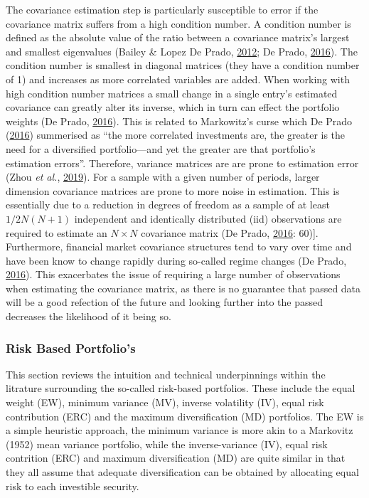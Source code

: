 \documentclass[11pt,preprint, authoryear]{elsarticle}
\numberwithin{equation}{section}
\numberwithin{figure}{section}
\numberwithin{table}{section}
\begin{document}
The covariance estimation step is particularly susceptible to error if
the covariance matrix suffers from a high condition number. A condition
number is defined as the absolute value of the ratio between a
covariance matrix's largest and smallest eigenvalues (Bailey \& Lopez De
Prado, \protect\hyperlink{ref-lopez2012}{2012}; De Prado,
\protect\hyperlink{ref-lopez}{2016}). The condition number is smallest
in diagonal matrices (they have a condition number of 1) and increases
as more correlated variables are added. When working with high condition
number matrices a small change in a single entry's estimated covariance
can greatly alter its inverse, which in turn can effect the portfolio
weights (De Prado, \protect\hyperlink{ref-lopez}{2016}). This is related
to Markowitz's curse which De Prado
(\protect\hyperlink{ref-lopez}{2016}) summerised as ``the more
correlated investments are, the greater is the need for a diversified
portfolio---and yet the greater are that portfolio's estimation
errors''. Therefore, variance matrices are are prone to estimation error
(Zhou \emph{et al.}, \protect\hyperlink{ref-zhou2019}{2019}). For a
sample with a given number of periods, larger dimension covariance
matrices are prone to more noise in estimation. This is essentially due
to a reduction in degrees of freedom as a sample of at least
\(1/2N(N+1)\) independent and identically distributed (iid) observations
are required to estimate an \(N\times N\) covariance matrix (De Prado,
\protect\hyperlink{ref-lopez}{2016}: 60){]}. Furthermore, financial
market covariance structures tend to vary over time and have been know
to change rapidly during so-called regime changes (De Prado,
\protect\hyperlink{ref-lopez}{2016}). This exacerbates the issue of
requiring a large number of observations when estimating the covariance
matrix, as there is no guarantee that passed data will be a good
refection of the future and looking further into the passed decreases
the likelihood of it being so.

\hypertarget{risk-based-portfolios}{%
\subsubsection{Risk Based Portfolio's}\label{risk-based-portfolios}}

This section reviews the intuition and technical underpinnings within
the litrature surrounding the so-called risk-based portfolios. These
include the equal weight (EW), minimum variance (MV), inverse volatility
(IV), equal risk contribution (ERC) and the maximum diversification (MD)
portfolios. The EW is a simple heuristic approach, the minimum variance
is more akin to a Markovitz (1952) mean variance portfolio, while the
inverse-variance (IV), equal risk contrition (ERC) and maximum
diversification (MD) are quite similar in that they all assume that
adequate diversification can be obtained by allocating equal risk to
each investible security.
\end{document}
